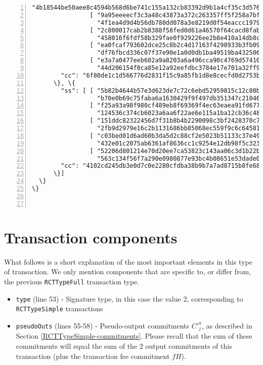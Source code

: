 \begin{appendices}
\begin{Verbatim}[commandchars=\\\{\}, numbers=left]
                  "4b18544be50aee8c4594b568d6be741c155a132cb83392d9b1a4cf35c3d5760c"], 
                [ "9a95eeeecf3c3a48c43873a372c263357ff5f258a7bf8ed29a767237b0b0f202", 
                  "4f1ea4d9d4b56db780dd078a3e8219d0f54eaccc197901671002a206f063cb0e"], 
                [ "2c800017cab2b8388f58fed0d61a46570f64cacd8fabc4e84ddee735b3135f0a", 
                  "458016f6fdf58b329fae0f929226ee2b8e410a14db8c6ede9b74fb718de71507"], 
                [ "ea0fcaf793602dce25c8b2c4d17163f4298933b3fb09874307d8cde9a63c2c0c", 
                  "df76fbcd336c07f37e90e1a0d0db1ba49519ba4325062228bc9242af2c525703"], 
                [ "e3a7a0477eeb602a9a8203a6a496cca90c4769d57410246c4c8d665df34df900", 
                  "44d206154f0ca85e12a92eefdbc3784e17e701a32ff93b550467679f67500c0d"]], 
        "cc": "6f80de1c1d566776d2831f15c9a85fb1d8e8cecfd0d2753b318f0e84d89d3b08"
      \}, \{
        "ss": [ [ "5b82b4644b57e3d623de7c72c6ebd52959815c12c80b479e4cbe5437cf67640c", 
                  "b70e0b69c75faba6a1630429f9f497db351347c210467f69e1b1c5f1a72afe02"], 
                [ "f25a93a98f980cf489eb8f69369f4ec63eaea91fd677decab9b6ca0fe2feb606", 
                  "124536c374cb6023a6aa6f22ae6e115a1ba12cb36c48f5f5ad43ce90f471da02"], 
                [ "151ddc82322456d7f31b8b4b2290098c3bf2428370c7ef325660b5463ff26404", 
                  "2fb9d2979e16c2b1131686bb85068ec559f9c6c64581e609b451bb2cd9d5740d"], 
                [ "c03bed01d6ad60b3da5d2c88cf2e5023b51133c37e4917511715a11f09d8740d", 
                  "432e01c2075ab6361af8636cc1c9254e12db98f5c323088792dfb42a1c894401"], 
                [ "52206d801214e70d20ee7ca53823c143aa06c3d1b22b118cc8a15c9f861f0102", 
                  "563c134f56f7a290e0980877e93bc4b08651e53dade079b1e6c066b70fb81406"]], 
        "cc": "4102cd245db3e0d7c0e2280cfdba38b9b7a7ad8715b8fe68c1170cf923b3d70d"
      \}]
  \}
\}



\end{Verbatim}


\section*{Transaction components}

What follows is a short explanation of the most important elements in this type of transaction. We only mention components that are specific to, or differ from, the previous {\tt RCTTypeFull} transaction type.


\begin{itemize}
	\item {\tt type} (line 53) - Signature type, in this case the value 2, corresponding to {\tt RCTTypeSimple} transactions
    \item {\tt pseudoOuts} (lines 55-58) - Pseudo-output commitments $C'^a_j$, as described in Section  \ref{RCTTypeSimple-commitments}. Please recall that the sum of these commitments will equal the sum of the 2 output commitments of this transaction (plus the transaction fee commitment $f H$).
\end{itemize}





\end{appendices}
